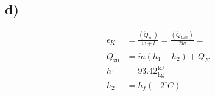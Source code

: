 

\subsection*{d)}
\begin{align*}
    \epsilon_K &= \frac{(\dot{Q}_{\text{zu}})}{\dot{w} + l} = \frac{(\dot{Q}_{\text{kalt}})}{2 \dot{w}} = \\
    \dot{Q}_{\text{zu}} &= \dot{m} (h_1 - h_2) + \dot{Q}_K \\
    h_1 &= 93.42 \frac{\text{kJ}}{\text{kg}} \\
    h_2 &= h_f (-2^\circ C)
\end{align*}